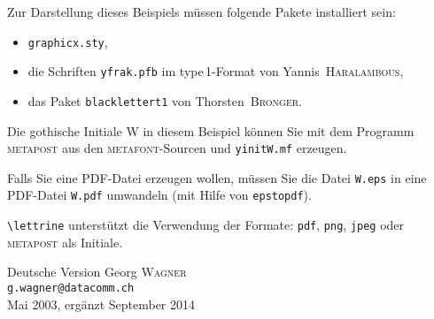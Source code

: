 \documentclass[a4paper,12pt,german]{article}
\newcommand{\MF}{{\small\scshape metafont}}
\newcommand{\MP}{{\small\scshape metapost}}
\begin{document}
Zur Darstellung dieses Beispiels müssen folgende Pakete installiert sein:
\begin{itemize}
\item \verb+graphicx.sty+,
\item die Schriften \verb+yfrak.pfb+ im type\,1-Format
   von Yannis~\textsc{Haralambous},
\item das Paket \verb+blacklettert1+ von Thorsten~\textsc{Bronger}.
\end{itemize}

Die gothische Initiale \glqq W\grqq{} in diesem Beispiel können Sie mit dem
Programm \MP{} aus den \MF{}-Sourcen und \verb+yinitW.mf+ erzeugen.

Falls Sie eine PDF-Datei erzeugen wollen, müssen Sie die Datei \verb+W.eps+
in eine PDF-Datei \verb+W.pdf+ umwandeln (mit Hilfe von \verb+epstopdf+).

\verb+\lettrine+ unterstützt die Verwendung der Formate:
\texttt{pdf}, \texttt{png}, \texttt{jpeg} oder \MP{} als Initiale.

\vfill
\begin{flushright}
  Deutsche Version Georg \textsc{Wagner}\\
  \texttt{g.wagner@datacomm.ch}\\
  Mai 2003, ergänzt September 2014
\end{flushright}
\end{document}
